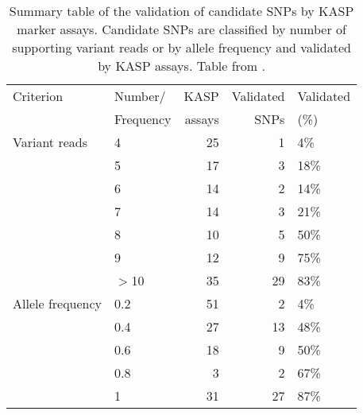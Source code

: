 
\begin{table}

\centering
\caption{Summary table of the validation of candidate SNPs by KASP marker assays. Candidate SNPs are classified by number of supporting variant reads or by allele frequency and validated by KASP assays. Table from \citet{King2015}.}
\label{tab:poly:mutSummary}

\begin{tabular}{llrrl}
\toprule
 Criterion        & Number/   &   KASP  &   Validated  & Validated   \\
          & Frequency   &    assays &    SNPs &  (\%)   \\
\midrule
Variant reads     & 4                  &            25 &                1 & 4\%              \\
                  & 5                  &            17 &                3 & 18\%             \\
                  & 6                  &            14 &                2 & 14\%             \\
                  & 7                  &            14 &                3 & 21\%             \\
                  & 8                  &            10 &                5 & 50\%             \\
                  & 9                  &            12 &                9 & 75\%             \\
                  & \ensuremath{>}10                &            35 &               29 & 83\%             \\
\midrule
 Allele frequency & 0.2                &            51 &                2 & 4\%              \\
                  & 0.4                &            27 &               13 & 48\%             \\
                  & 0.6                &            18 &                9 & 50\%             \\
                  & 0.8                &             3 &                2 & 67\%             \\
                  & 1                  &            31 &               27 & 87\%             \\
\bottomrule
\end{tabular}
\end{table}